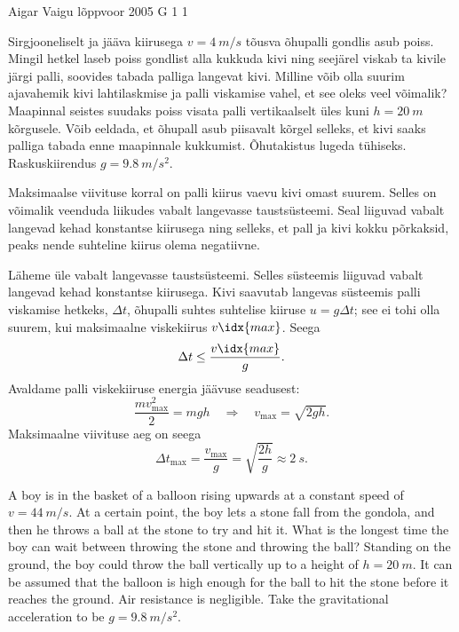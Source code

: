 {Aigar Vaigu} %
{lõppvoor} %
{2005} %
{G 1} %
{1} %
{
\ifStatement
Sirgjooneliselt ja jääva kiirusega $v = \SI{4}{m/s}$ tõusva õhupalli gondlis asub poiss. Mingil hetkel laseb poiss gondlist alla kukkuda kivi ning seejärel viskab ta kivile järgi palli, soovides tabada palliga langevat kivi. Milline võib olla suurim ajavahemik kivi lahtilaskmise ja palli viskamise vahel, et see oleks veel võimalik? Maapinnal seistes suudaks poiss visata palli vertikaalselt üles kuni $h = \SI{20}{m}$ kõrgusele. Võib eeldada, et õhupall asub piisavalt kõrgel selleks, et kivi saaks palliga tabada enne maapinnale kukkumist. Õhutakistus lugeda tühiseks. Raskuskiirendus $g = \SI{9,8}{m/s^2}$.
\fi


\ifHint
Maksimaalse viivituse korral on palli kiirus vaevu kivi omast suurem. Selles on võimalik veenduda liikudes vabalt langevasse taustsüsteemi. Seal liiguvad vabalt langevad kehad konstantse kiirusega ning selleks, et pall ja kivi kokku põrkaksid, peaks nende suhteline kiirus olema negatiivne.
\fi


\ifSolution
Läheme üle vabalt langevasse taustsüsteemi. Selles süsteemis liiguvad vabalt langevad kehad konstantse kiirusega. Kivi saavutab langevas süsteemis palli viskamise hetkeks, $\Delta t$, õhupalli suhtes suhtelise kiiruse $u = g\Delta t$; see ei tohi olla suurem, kui maksimaalne viskekiirus $v\idx{max}$. Seega
\[
\Delta t \leq \frac{v\idx{max}}{g}.
\]
Avaldame palli viskekiiruse energia jäävuse seadusest:
\[
\frac{m v_{\max }^{2}}{2}=m g h \quad \Rightarrow \quad v_{\max }=\sqrt{2 g h}.
\]
Maksimaalne viivituse aeg on seega
\[
\Delta t_{\max }=\frac{v_{\max }}{g}=\sqrt{\frac{2 h}{g}} \approx \SI{2}{s}.
\]
\fi

\ifEngStatement
A boy is in the basket of a balloon rising upwards at a constant speed of $v=4\SI{4}{m/s}$. At a certain point, the boy lets a stone fall from the gondola, and then he throws a ball at the stone to try and hit it. What is the longest time the boy can wait between throwing the stone and throwing the ball? Standing on the ground, the boy could throw the ball vertically up to a height of $h = \SI{20}{m}$. It can be assumed that the balloon is high enough for the ball to hit the stone before it reaches the ground. Air resistance is negligible. Take the gravitational acceleration to be $g=\SI{9.8}{m/s^2}$.  
\fi
}